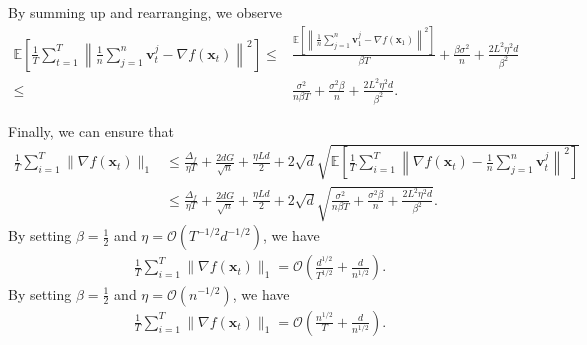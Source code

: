 \documentclass{article}
\newcommand{\E}{\mathbb{E}}
\newcommand{\Norm}[1]{\left\|#1\right\|}
\def \E {\mathbb{E}}
\def \v {\mathbf{v}}
\def \x {\mathbf{x}}
\def \E {\mathbb{E}}
\def \x {\mathbf{x}}
\def \v {\mathbf{v}}
\begin{document}
By summing up and rearranging, we observe
\begin{equation}\label{vr}
    \begin{split}
         \E\left[\frac{1}{T}\sum_{t=1}^T \Norm{\frac{1}{n}\sum_{j=1}^n \v_{t}^j - \nabla f(\x_{t})}^2\right]
     \leq &\frac{\E\left[\Norm{\frac{1}{n}\sum_{j=1}^n \v_{1}^j - \nabla f(\x_{1})}^2\right]}{\beta T} + \frac{\beta\sigma^2}{n} + \frac{2L^2 \eta^2 d}{\beta^2}\\
     \leq &\frac{\sigma^2}{n\beta T} + \frac{\sigma^2 \beta}{n} + \frac{2L^2 \eta^2 d}{\beta^2}.
    \end{split}
\end{equation}

Finally, we can ensure that
\begin{align*}
     \frac{1}{T} \sum_{i=1}^{T} \| \nabla f(\x_t) \|_1 &\leq \frac{\Delta_f}{\eta T} + \frac{2d G}{\sqrt{n}} + \frac{\eta L d}{2}+2\sqrt{d}\sqrt{\E\left[\frac{1}{T} \sum_{i=1}^{T} \left\| \nabla f(\x_t) - \frac{1}{n}\sum_{j=1}^{n}\v_t^j  \right\|^2 \right]}\\
     & \leq \frac{\Delta_f}{\eta T}+  \frac{2d G}{\sqrt{n}} + \frac{\eta L d}{2}  + 2\sqrt{d}\sqrt{\frac{\sigma^2}{n\beta T} + \frac{\sigma^2 \beta}{n} + \frac{2L^2 \eta^2 d}{\beta^2   }}.
\end{align*}
By setting $\beta=\frac{1}{2}$ and $\eta = \mathcal{O}\left({T^{-1/2}d^{-1/2}}\right)$, we have
\begin{align*}
     \frac{1}{T} \sum_{i=1}^{T} \| \nabla f(\x_t) \|_1 =\mathcal{O}\left( \frac{d^{1/2}}{T^{1/2}} + \frac{d}{n^{1/2}} \right).
\end{align*}
By setting $\beta=\frac{1}{2}$ and $\eta = \mathcal{O}\left({n^{-1/2}}\right)$, we have
\begin{align*}
     \frac{1}{T} \sum_{i=1}^{T} \| \nabla f(\x_t) \|_1 =\mathcal{O}\left( \frac{n^{1/2}}{T} + \frac{d}{n^{1/2}} \right).
\end{align*}
\end{document}
